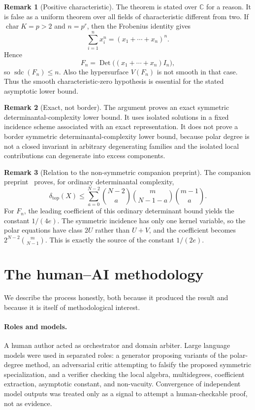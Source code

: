 \documentclass[11pt]{article}
\theoremstyle{plain}
\theoremstyle{definition}
\newtheorem{remark}{Remark}
\DeclareMathOperator{\sdc}{sdc}
\DeclareMathOperator{\Det}{Det}
\newcommand{\CC}{\mathbb{C}}
\newcommand{\pdeg}{\delta}
\begin{document}
\begin{remark}[Positive characteristic]
\label{rem:positivechar}
The theorem is stated over $\CC$ for a reason.  It is false as a uniform theorem
over all fields of characteristic different from two.  If $\operatorname{char} K
=p>2$ and $n=p^r$, then the Frobenius identity gives
\[
  \sum_{i=1}^n x_i^n=(x_1+\cdots+x_n)^n.
\]
Hence
\[
  F_n=\Det\big((x_1+\cdots+x_n)I_n\big),
\]
so $\sdc(F_n)\le n$.  Also the hypersurface $V(F_n)$ is not smooth in that case.
Thus the smooth characteristic-zero hypothesis is essential for the stated
asymptotic lower bound.
\end{remark}

\begin{remark}[Exact, not border]
The argument proves an exact symmetric determinantal-complexity lower bound.  It
uses isolated solutions in a fixed incidence scheme associated with an exact
representation.  It does not prove a border symmetric determinantal-complexity
lower bound, because polar degree is not a closed invariant in arbitrary
degenerating families and the isolated local contributions can degenerate into
excess components.
\end{remark}

\begin{remark}[Relation to the non-symmetric companion preprint]
The companion preprint~\cite{SheshadriArxiv} proves, for ordinary
determinantal complexity,
\[
  \pdeg_{\mathrm{top}}(X)\le
  \sum_{a=0}^{N-2}\binom{N-2}{a}\binom{m}{N-1-a}\binom{m-1}{a}.
\]
For $F_n$, the leading coefficient of this ordinary determinant bound yields the
constant $1/(4e)$.  The symmetric incidence has only one kernel variable, so the
polar equations have class $2U$ rather than $U+V$, and the coefficient becomes
$2^{N-2}\binom{m}{N-1}$.  This is exactly the source of the constant $1/(2e)$.
\end{remark}

\section{The human--AI methodology}
\label{sec:methodology}

We describe the process honestly, both because it produced the result and
because it is itself of methodological interest.

\paragraph{Roles and models.}
A human author acted as orchestrator and domain arbiter.  Large language models
were used in separated roles: a generator proposing variants of the
polar-degree method, an adversarial critic attempting to falsify the proposed
symmetric specialization, and a verifier checking the local algebra,
multidegrees, coefficient extraction, asymptotic constant, and non-vacuity.
Convergence of independent model outputs was treated only as a signal to attempt
a human-checkable proof, not as evidence.
\end{document}
